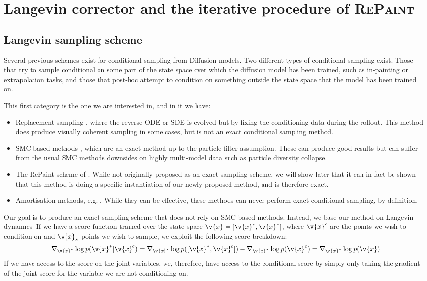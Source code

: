 \section{Langevin corrector and the iterative procedure of \textsc{RePaint}~\parencite{lugmayr2022repaint}}
\label{sec:app_conditional_sampling}

\subsection{Langevin sampling scheme}

Several previous schemes exist for conditional sampling from Diffusion models.
Two different types of conditional sampling exist.
Those that try to sample conditional on some part of the state space over which the diffusion model has been trained, such as in-painting or extrapolation tasks, and those that post-hoc attempt to condition on something outside the state space that the model has been trained on.

This first category is the one we are interested in, and in it we have: \begin{itemize} \item Replacement sampling \cite{song2020score}, where the reverse ODE or SDE is evolved but by fixing the conditioning data during the rollout.
	      This method does produce visually coherent sampling in some cases, but is not an exact conditional sampling method.
	\item SMC-based methods \cite{trippe2022Diffusion}, which are an exact method up to the particle filter assumption.
	      These can produce good results but can suffer from the usual SMC methods downsides on highly multi-model data such as particle diversity collapse.
	\item The {\textsc RePaint} scheme of \cite{lugmayr2022repaint}.
	      While not originally proposed as an exact sampling scheme, we will show later that it can in fact be shown that this method is doing a specific instantiation of our newly proposed method, and is therefore exact.
	\item Amortisation methods, e.g. \textcite{phillips2022spectral}.
	      While they can be effective, these methods can never perform exact conditional sampling, by definition.
\end{itemize}

Our goal is to produce an exact sampling scheme that does not rely on SMC-based methods.
Instead, we base our method on Langevin dynamics.
If we have a score function trained over the state space $\v{x} = [\v{x}^c, \v{x}^*]$, where $\v{x}^c$ are the points we wish to condition on and $\v{x}_s$ points we wish to sample, we exploit the following score breakdown: \[\nabla_{\v{x}^*} \log p(\v{x}^*|\v{x}^c) = \nabla_{\v{x}^*} \log p([\v{x}^*, \v{x}^c]) - \nabla_{\v{x}^*} \log p(\v{x}^c) = \nabla_{\v{x}^*} \log p(\v{x})\] If we have access to the score on the joint variables, we, therefore, have access to the conditional score by simply only taking the gradient of the joint score for the variable we are not conditioning on.

